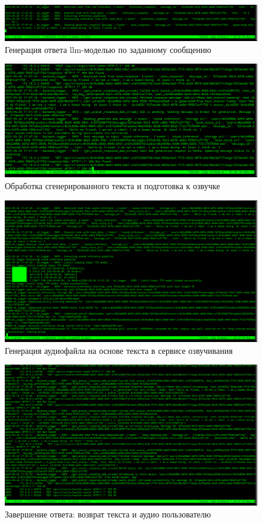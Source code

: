 \begin{figure}
    \centering
    \includegraphics[width=1.0\linewidth]{images/results/llm-inference.png}
    \caption{Генерация ответа llm-моделью по заданному сообщению}
    \label{fig:res-llm-inference}
\end{figure}

\begin{figure}
    \centering
    \includegraphics[width=1.0\linewidth]{images/results/bk-middle-gen-llm-done.png}
    \caption{Обработка сгенерированного текста и подготовка к озвучке}
    \label{fig:res-bk-middle-gen-llm-done}
\end{figure}

\begin{figure}
    \centering
    \includegraphics[width=1.0\linewidth]{images/results/sound-inference.png}
    \caption{Генерация аудиофайла на основе текста в сервисе озвучивания}
    \label{fig:res-sound-inference}
\end{figure}

\begin{figure}
    \centering
    \includegraphics[width=1.0\linewidth]{images/results/bk-end-inference.png}
    \caption{Завершение ответа: возврат текста и аудио пользователю}
    \label{fig:res-bk-end-inference}
\end{figure}